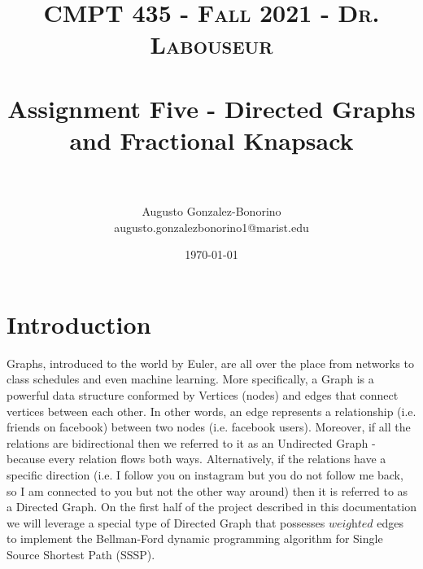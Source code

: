 \documentclass[letterpaper, 10pt]{article}
\title{	
   \normalfont \normalsize 
   \textsc{CMPT 435 - Fall 2021 - Dr. Labouseur} \\[10pt] %
   \horrule{0.5pt} \\[0.25cm] 	%
   \huge Assignment Five - Directed Graphs and Fractional Knapsack \\     	    %
   \horrule{0.5pt} \\[0.25cm] 	%
}
\author{Augusto Gonzalez-Bonorino \\ \normalsize augusto.gonzalezbonorino1@marist.edu}
\date{\normalsize\today} 	%
\begin{document}
\maketitle %



\section{Introduction}

Graphs, introduced to the world by Euler, are all over the place from networks to class schedules and even machine learning. More specifically, a Graph is a powerful data structure conformed by Vertices (nodes) and edges that connect vertices between each other. In other words, an edge represents a relationship (i.e. friends on facebook) between two nodes (i.e. facebook users). Moreover, if all the relations are bidirectional then we referred to it as an Undirected Graph - because every relation flows both ways. Alternatively, if the relations have a specific direction (i.e. I follow you on instagram but you do not follow me back, so I am connected to you but not the other way around) then it is referred to as a Directed Graph. On the first half of the project described in this documentation we will leverage a special type of Directed Graph that possesses $\textit{weighted}$ edges to implement the Bellman-Ford dynamic programming algorithm for Single Source Shortest Path (SSSP).
\end{document}
